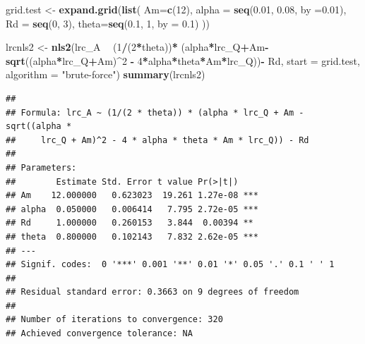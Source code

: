 \documentclass[]{krantz}
\makeatletter
\newenvironment{Shaded}{\begin{snugshade}}{\end{snugshade}}
\newcommand{\KeywordTok}[1]{\textcolor[rgb]{0.13,0.29,0.53}{\textbf{#1}}}
\newcommand{\DataTypeTok}[1]{\textcolor[rgb]{0.13,0.29,0.53}{#1}}
\newcommand{\DecValTok}[1]{\textcolor[rgb]{0.00,0.00,0.81}{#1}}
\newcommand{\FloatTok}[1]{\textcolor[rgb]{0.00,0.00,0.81}{#1}}
\newcommand{\StringTok}[1]{\textcolor[rgb]{0.31,0.60,0.02}{#1}}
\newcommand{\OperatorTok}[1]{\textcolor[rgb]{0.81,0.36,0.00}{\textbf{#1}}}
\newcommand{\NormalTok}[1]{#1}
\newenvironment{kframe}{%
\medskip{}
\setlength{\fboxsep}{.8em}
 \def\at@end@of@kframe{}%
 \ifinner\ifhmode%
  \def\at@end@of@kframe{\end{minipage}}%
  \begin{minipage}{\columnwidth}%
 \fi\fi%
 \def\FrameCommand##1{\hskip\@totalleftmargin \hskip-\fboxsep
 \colorbox{shadecolor}{##1}\hskip-\fboxsep
     \hskip-\linewidth \hskip-\@totalleftmargin \hskip\columnwidth}%
 \MakeFramed {\advance\hsize-\width
   \@totalleftmargin\z@ \linewidth\hsize
   \@setminipage}}%
 {\par\unskip\endMakeFramed%
 \at@end@of@kframe}
\renewenvironment{Shaded}{\begin{kframe}}{\end{kframe}}
\theoremstyle{definition}
\theoremstyle{definition}
\theoremstyle{definition}
\theoremstyle{remark}
\makeatother
\begin{document}
\begin{Shaded}
\begin{Highlighting}[]
\NormalTok{grid.test <-}\StringTok{ }\KeywordTok{expand.grid}\NormalTok{(}\KeywordTok{list}\NormalTok{(}
  \DataTypeTok{Am=}\KeywordTok{c}\NormalTok{(}\DecValTok{12}\NormalTok{),}
  \DataTypeTok{alpha =} \KeywordTok{seq}\NormalTok{(}\FloatTok{0.01}\NormalTok{, }\FloatTok{0.08}\NormalTok{, }\DataTypeTok{by =}\FloatTok{0.01}\NormalTok{),}
  \DataTypeTok{Rd =} \KeywordTok{seq}\NormalTok{(}\DecValTok{0}\NormalTok{, }\DecValTok{3}\NormalTok{),}
  \DataTypeTok{theta=}\KeywordTok{seq}\NormalTok{(}\FloatTok{0.1}\NormalTok{, }\DecValTok{1}\NormalTok{, }\DataTypeTok{by =} \FloatTok{0.1}\NormalTok{)}
\NormalTok{  ))}

\NormalTok{lrcnls2 <-}\StringTok{ }\KeywordTok{nls2}\NormalTok{(lrc_A }\OperatorTok{~}\StringTok{ }
\StringTok{        }\NormalTok{(}\DecValTok{1}\OperatorTok{/}\NormalTok{(}\DecValTok{2}\OperatorTok{*}\NormalTok{theta))}\OperatorTok{*}
\StringTok{        }\NormalTok{(alpha}\OperatorTok{*}\NormalTok{lrc_Q}\OperatorTok{+}\NormalTok{Am}\OperatorTok{-}\KeywordTok{sqrt}\NormalTok{((alpha}\OperatorTok{*}\NormalTok{lrc_Q}\OperatorTok{+}\NormalTok{Am)}\OperatorTok{^}\DecValTok{2} \OperatorTok{-}\StringTok{ }
\StringTok{                               }\DecValTok{4}\OperatorTok{*}\NormalTok{alpha}\OperatorTok{*}\NormalTok{theta}\OperatorTok{*}\NormalTok{Am}\OperatorTok{*}\NormalTok{lrc_Q))}\OperatorTok{-}\StringTok{ }
\StringTok{        }\NormalTok{Rd, }\DataTypeTok{start =}\NormalTok{ grid.test, }\DataTypeTok{algorithm =} \StringTok{"brute-force"}\NormalTok{)}
\KeywordTok{summary}\NormalTok{(lrcnls2)}
\end{Highlighting}
\end{Shaded}

\begin{verbatim}
## 
## Formula: lrc_A ~ (1/(2 * theta)) * (alpha * lrc_Q + Am - sqrt((alpha * 
##     lrc_Q + Am)^2 - 4 * alpha * theta * Am * lrc_Q)) - Rd
## 
## Parameters:
##        Estimate Std. Error t value Pr(>|t|)    
## Am    12.000000   0.623023  19.261 1.27e-08 ***
## alpha  0.050000   0.006414   7.795 2.72e-05 ***
## Rd     1.000000   0.260153   3.844  0.00394 ** 
## theta  0.800000   0.102143   7.832 2.62e-05 ***
## ---
## Signif. codes:  0 '***' 0.001 '**' 0.01 '*' 0.05 '.' 0.1 ' ' 1
## 
## Residual standard error: 0.3663 on 9 degrees of freedom
## 
## Number of iterations to convergence: 320 
## Achieved convergence tolerance: NA
\end{verbatim}
\end{document}
